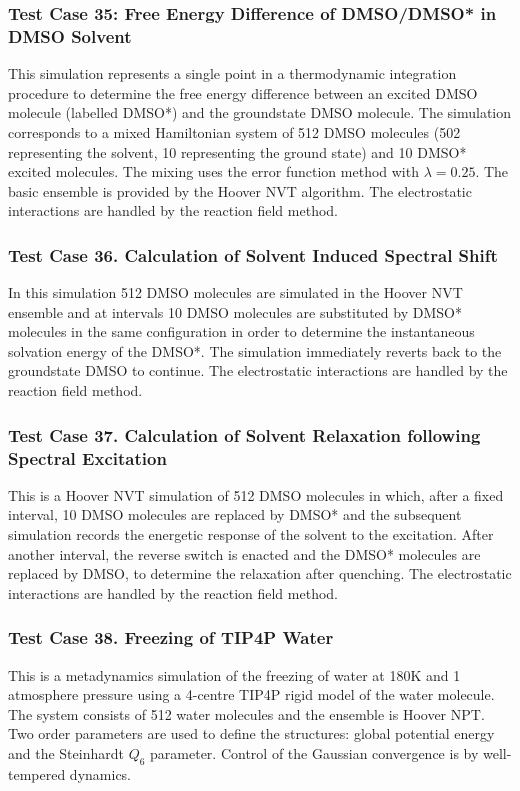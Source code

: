 \subsubsection{Test Case 35: Free Energy Difference of DMSO/DMSO* in DMSO Solvent}
This simulation represents a single point in a thermodynamic integration
procedure to determine the free energy difference between an excited DMSO
molecule (labelled DMSO*) and the groundstate DMSO molecule. The simulation
corresponds to a mixed Hamiltonian system of 512 DMSO molecules (502
representing the solvent, 10 representing the ground state) and 10 DMSO*
excited molecules. The mixing uses the error function method with
$\lambda=0.25$. The basic ensemble is provided by the Hoover NVT algorithm.
The electrostatic interactions are handled by the reaction field method.

\subsubsection{Test Case 36. Calculation of Solvent Induced Spectral Shift}
In this simulation 512 DMSO molecules are simulated in the Hoover NVT ensemble
and at intervals 10 DMSO molecules are substituted by DMSO* molecules in the
same configuration in order to determine the instantaneous solvation energy of
the DMSO*. The simulation immediately reverts back to the groundstate DMSO to
continue. The electrostatic interactions are handled by the reaction field method.

\subsubsection{Test Case 37. Calculation of Solvent Relaxation following
  Spectral Excitation}
This is a Hoover NVT simulation of 512 DMSO molecules in which, after a fixed
interval, 10 DMSO molecules are replaced by DMSO* and the subsequent
simulation records the energetic response of the solvent to the excitation.
After another interval, the reverse switch is enacted and the DMSO* molecules
are replaced by DMSO, to determine the relaxation after quenching.
The electrostatic interactions are handled by the reaction field method.

\subsubsection{Test Case 38. Freezing of TIP4P Water}
This is a metadynamics simulation of the freezing of water at 180K and 1
atmosphere pressure using a 4-centre TIP4P rigid model of the water molecule.
The system consists of 512 water molecules and the ensemble is Hoover NPT. Two
order parameters are used to define the structures: global potential energy
and the Steinhardt $Q_{6}$ parameter. Control of the Gaussian convergence is
by well-tempered dynamics.

